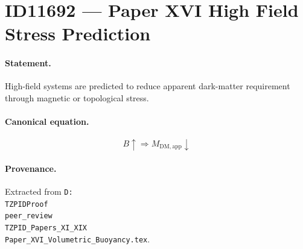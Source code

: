 \section*{ID11692 --- Paper XVI High Field Stress Prediction}

\paragraph{Statement.}
High-field systems are predicted to reduce apparent dark-matter requirement through magnetic or topological stress.

\paragraph{Canonical equation.}
\[
B\uparrow\Rightarrow M_{\mathrm{DM,app}}\downarrow
\]

\paragraph{Provenance.}
Extracted from \texttt{D:\\TZPIDProof\\peer\_review\\TZPID\_Papers\_XI\_XIX\\Paper\_XVI\_Volumetric\_Buoyancy.tex}.
